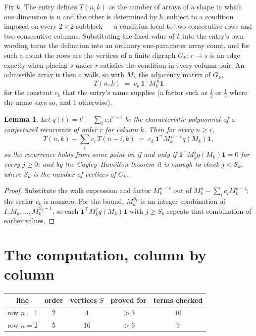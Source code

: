 \documentclass[11pt,a4paper]{article}
\theoremstyle{plain}
\newtheorem{lemma}[theorem]{Lemma}
\theoremstyle{definition}
\begin{document}
Fix $k$. The entry defines $T(n,k)$ as the number of arrays of a shape in which one dimension
is $n$ and the other is determined by $k$, subject to a condition imposed on every
$2\times2$ subblock --- a condition local to two consecutive rows and two consecutive columns.
Substituting the fixed value of $k$ into the entry's own wording turns the definition into an
ordinary one-parameter array count, and for such a count the rows are the vertices of a finite
digraph $G_k$: $r\to s$ is an edge exactly when placing $s$ under $r$ satisfies the condition
in every column pair. An admissible array is then a walk, so with $M_k$ the adjacency matrix
of $G_k$,
\[
T(n,k)\;=\;c_k\,\mathbf{1}^{\!\top}M_k^{\,n}\mathbf{1}
\]
for the constant $c_k$ that the entry's name supplies (a factor such as $\tfrac12$ or
$\tfrac14$ where the name says so, and $1$ otherwise).

\begin{lemma}\label{lem:crit}
Let $q(t)=t^{r}-\sum_i c_it^{r-i}$ be the characteristic polynomial of a conjectured
recurrence of order $r$ for column $k$. Then for every $n\ge r$,
\[
T(n,k)-\sum_i c_i\,T(n-i,k)\;=\;c_k\,\mathbf{1}^{\!\top}M_k^{\,n-r}q(M_k)\mathbf{1},
\]
so the recurrence holds from some point on if and only if
$\mathbf{1}^{\!\top}M_k^{j}q(M_k)\mathbf{1}=0$ for every $j\ge0$; and by the
Cayley--Hamilton theorem it is enough to check $j<S_k$, where $S_k$ is the number of vertices
of $G_k$.
\end{lemma}

\begin{proof}
Substitute the walk expression and factor $M_k^{n-r}$ out of $M_k^{n}-\sum_ic_iM_k^{n-i}$;
the scalar $c_k$ is nonzero. For the bound, $M_k^{S_k}$ is an integer combination of
$I,M_k,\dots,M_k^{S_k-1}$, so each $\mathbf{1}^{\!\top}M_k^{j}q(M_k)\mathbf{1}$ with
$j\ge S_k$ repeats that combination of earlier values.
\end{proof}

\section{The computation, column by column}

\begin{center}
\begin{tabular}{ccccc}
line & order & vertices $S$ & proved for & terms checked \\ \hline
row $n$$=1$ & $2$ & $4$ & $>3$ & $10$ \\
row $n$$=2$ & $5$ & $16$ & $>6$ & $9$ \\
\end{tabular}
\end{center}
\end{document}
